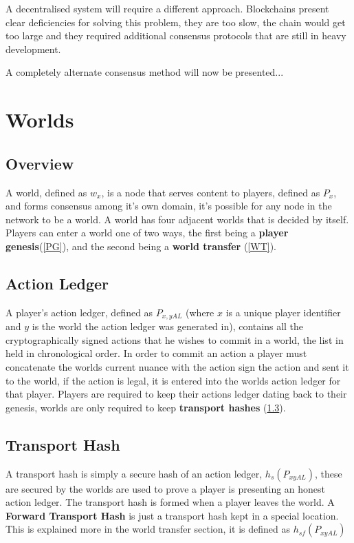 \documentclass[runningheads,a4paper]{llncs}
\begin{document}
A decentralised system will require a different approach. Blockchains present clear deficiencies for solving this problem, they are too slow, the chain would get too large and they required additional consensus protocols that are still in heavy development. 

A completely alternate consensus method will now be presented...

\section{Worlds}

\subsection{Overview}
A world, defined as $w_x$, is a node that serves content to players, defined as $P_x$, and forms consensus among it's own domain, it's possible for any node in the network to be a world. A world has four adjacent worlds that is decided by itself. Players can enter a world one of two ways, the first being a \textbf{player genesis}(\ref{PG}), and the second being a \textbf{world transfer} (\ref{WT}).

\subsection{Action Ledger}
\label{AL}
A player's action ledger, defined as $P_{x,yAL}$ (where $x$ is a unique player identifier and $y$ is the world the action ledger was generated in), contains all the cryptographically signed actions that he wishes to commit in a world, the list in held in chronological order. In order to commit an action a player must concatenate the worlds current nuance with the action sign the action and sent it to the world, if the action is legal, it is entered into the worlds action ledger for that player. Players are required to keep their actions ledger dating back to their genesis, worlds are only required to keep \textbf{transport hashes} (\ref{TH}).

\subsection{Transport Hash}
\label{TH}
A transport hash is simply a secure hash of an action ledger, $h_s(P_{xyAL})$, these are secured by the worlds are used to prove a player is presenting an honest action ledger. The transport hash is formed when a player leaves the world. A \textbf{Forward Transport Hash} is just a transport hash kept in a special location. This is explained more in the world transfer section, it is defined as  $h_{sf}(P_{xyAL})$
\end{document}
